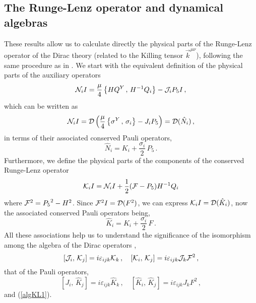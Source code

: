 \documentclass[a4paper,12pt]{article}
\begin{document}
\subsection{The Runge-Lenz operator and dynamical algebras}

These results allow us to calculate directly the physical parts of the 
Runge-Lenz operator of the Dirac theory (related to the Killing tensor 
$\vec{k}^{\mu\nu}$), following the same procedure as in \cite{CV3}.  
We start with the equivalent definition of the physical parts of the 
auxiliary operators \cite{CV3}   
\begin{equation}
{\cal N}_{i}I=\frac{\mu}{4}\left\{HQ^{Y}\,,\,H^{-1}Q_{i}\right\}-
{\cal J}_{i}P_{5}I\,,
\end{equation}   
which can be written as 
\begin{equation}
{\cal N}_{i}I={\cal D}\left(\frac{\mu}{4}\left\{ \sigma^{Y}\,,\,\sigma_{i}
\right\}-
 J_{i}P_{5}\right)={\cal D}(\hat N_{i})\,,
\end{equation}   
in terms of their associated conserved Pauli operators, 
\begin{equation}\label{Nas}
\hat N_{i}=K_{i}+\frac{\sigma_{i}}{2}\,P_{5}\,.
\end{equation}
Furthermore, we define the physical parts of the components of the 
conserved Runge-Lenz operator \cite{CV3,CV4} 
\begin{equation}\label{KI}
{\cal K}_{i}I={\cal N}_{i}I+ \frac{1}{2}({\cal F}-P_5)H^{-1} Q_i
\end{equation}
where ${\cal F}^{2}={P_{5}}^{2}-H^2$. Since  ${\cal F}^2 I={\cal D}(F^2)$,  
we can express  ${\cal K}_{i}I= {\cal D}(\hat K_{i})$, now the    
associated conserved Pauli operators being, 
\begin{equation}\label{Kas}
\hat K_{i}=K_{i} +\frac{\sigma_{i}}{2}\,F\,.
\end{equation} 
All these associations help us to understand the significance 
of the isomorphism among the algebra of the Dirac operators 
\cite{CV3,CV4}, 
\begin{equation}
\left[ {\cal J}_{i},\, {\cal K}_{j}\right]=i\varepsilon _{ijk}{\cal K}_{k}
\,,\quad
\left[ {\cal K}_{i},\, {\cal K}_{j}\right]=i\varepsilon _{ijk}{\cal J}_{k}
{\cal F}^{2}\,,
\end{equation}
that of the Pauli operators,
\begin{equation}
\left[  J_{i},\, \hat K_{j}\right]=i\varepsilon _{ijk}{\hat K}_{k}
\,, \quad
\left[ {\hat K}_{i},\, {\hat K}_{j}\right]=i\varepsilon _{ijk} J_{k}
 F^{2}\,,
\end{equation}
and (\ref{algKL1}).
\end{document}
